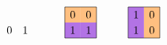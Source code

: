 \documentclass[12pt]{article}
\theoremstyle{definition} %
\begin{document}
\[\begin{tikzpicture}[scale=1]
\begin{scope}[shift={(8,0)}]
        \draw (.25,.25) node{$0$}; \draw (.75,.25) node{$1$};
    \end{scope}
    \begin{scope}[shift={(10,0)}]
        \path[fill=actOrange] (0,.5) rectangle ++(.5,.5); 
        \path[fill=actOrange] (.5,.5) rectangle ++(.5,.5);
        \path[fill=actPurple] (0,0) rectangle ++(.5,.5);
        \path[fill=actPurple] (.5,0) rectangle ++(.5,.5);
        \draw (0,0) rectangle (1,1);
        \draw (.25,.75) node{$0$}; \draw (.75,.75) node{$0$};
        \draw (.25,.25) node{$1$}; \draw (.75,.25) node{$1$};
    \end{scope}
    \begin{scope}[shift={(12,0)}]
        \path[fill=actPurple] (0,.5) rectangle ++(.5,.5); 
        \path[fill=actOrange] (.5,.5) rectangle ++(.5,.5);
        \path[fill=actPurple] (0,0) rectangle ++(.5,.5);
        \path[fill=actOrange] (.5,0) rectangle ++(.5,.5);
        \draw (0,0) rectangle (1,1);
        \draw (.25,.75) node{$1$}; \draw (.75,.75) node{$0$};
        \draw (.25,.25) node{$1$}; \draw (.75,.25) node{$0$};
    \end{scope}
\end{tikzpicture}
\]
\end{document}
